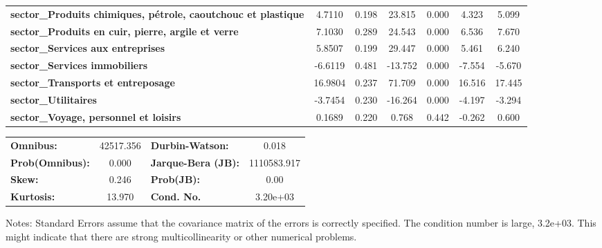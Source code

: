 \begin{center}
\begin{tabular}{lcccccc}
\textbf{sector\_Produits chimiques, pétrole, caoutchouc et plastique} &       4.7110  &        0.198     &    23.815  &         0.000        &        4.323    &        5.099     \\
\textbf{sector\_Produits en cuir, pierre, argile et verre}            &       7.1030  &        0.289     &    24.543  &         0.000        &        6.536    &        7.670     \\
\textbf{sector\_Services aux entreprises}                             &       5.8507  &        0.199     &    29.447  &         0.000        &        5.461    &        6.240     \\
\textbf{sector\_Services immobiliers}                                 &      -6.6119  &        0.481     &   -13.752  &         0.000        &       -7.554    &       -5.670     \\
\textbf{sector\_Transports et entreposage}                            &      16.9804  &        0.237     &    71.709  &         0.000        &       16.516    &       17.445     \\
\textbf{sector\_Utilitaires}                                          &      -3.7454  &        0.230     &   -16.264  &         0.000        &       -4.197    &       -3.294     \\
\textbf{sector\_Voyage, personnel et loisirs}                         &       0.1689  &        0.220     &     0.768  &         0.442        &       -0.262    &        0.600     \\
\bottomrule
\end{tabular}
\begin{tabular}{lclc}
\textbf{Omnibus:}       & 42517.356 & \textbf{  Durbin-Watson:     } &      0.018   \\
\textbf{Prob(Omnibus):} &    0.000  & \textbf{  Jarque-Bera (JB):  } & 1110583.917  \\
\textbf{Skew:}          &    0.246  & \textbf{  Prob(JB):          } &       0.00   \\
\textbf{Kurtosis:}      &   13.970  & \textbf{  Cond. No.          } &   3.20e+03   \\
\bottomrule
\end{tabular}
\end{center}

Notes: \newline
 [1] Standard Errors assume that the covariance matrix of the errors is correctly specified. \newline
 [2] The condition number is large, 3.2e+03. This might indicate that there are \newline
 strong multicollinearity or other numerical problems.